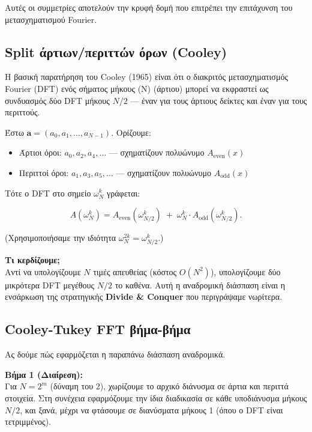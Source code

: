 \documentclass[a4paper, 11pt]{article}
\providecommand{\tightlist}{\setlength{\itemsep}{0pt}\setlength{\parskip}{0pt}}
\begin{document}
Αυτές οι συμμετρίες αποτελούν την κρυφή δομή που επιτρέπει την
επιτάχυνση του μετασχηματισμού Fourier.

\subsection{Split άρτιων/περιττών όρων
(Cooley)}\label{split-ux3acux3c1ux3c4ux3b9ux3c9ux3bdux3c0ux3b5ux3c1ux3b9ux3c4ux3c4ux3ceux3bd-ux3ccux3c1ux3c9ux3bd-cooley}

Η βασική παρατήρηση του Cooley (1965) είναι ότι ο διακριτός
μετασχηματισμός Fourier (DFT) ενός σήματος μήκους (N) (άρτιου) μπορεί να
εκφραστεί ως συνδυασμός δύο DFT μήκους \(N/2\) --- έναν για τους άρτιους
δείκτες και έναν για τους περιττούς.

Έστω \(\mathbf{a} = (a_0, a_1, \dots, a_{N-1})\). Ορίζουμε:

\begin{itemize}
\tightlist
\item
  Άρτιοι όροι: \(a_0, a_2, a_4, \dots\) --- σχηματίζουν πολυώνυμο
  \(A_{\text{even}}(x)\)
\item
  Περιττοί όροι: \(a_1, a_3, a_5, \dots\) --- σχηματίζουν πολυώνυμο
  \(A_{\text{odd}}(x)\)
\end{itemize}

Τότε ο DFT στο σημείο \(\omega_N^k\) γράφεται:

\[
A(\omega_N^k) = A_{\text{even}}(\omega_{N/2}^k) \;+\; \omega_N^k \cdot A_{\text{odd}}(\omega_{N/2}^k).
\]

(Χρησιμοποιήσαμε την ιδιότητα \(\omega_N^{2k} = \omega_{N/2}^k\).)

\textbf{Τι κερδίζουμε;}\\
Αντί να υπολογίζουμε \(N\) τιμές απευθείας (κόστος \(O(N^2)\)),
υπολογίζουμε δύο μικρότερα DFT μεγέθους \(N/2\) το καθένα. Αυτή η
αναδρομική διάσπαση είναι η ενσάρκωση της στρατηγικής \textbf{Divide \&
Conquer} που περιγράψαμε νωρίτερα.

\subsection{Cooley-Tukey FFT
βήμα-βήμα}\label{cooley-tukey-fft-ux3b2ux3aeux3bcux3b1-ux3b2ux3aeux3bcux3b1}

Ας δούμε πώς εφαρμόζεται η παραπάνω διάσπαση αναδρομικά.

\textbf{Βήμα 1 (Διαίρεση):}\\
Για \(N = 2^m\) (δύναμη του 2), χωρίζουμε το αρχικό διάνυσμα σε άρτια
και περιττά στοιχεία. Στη συνέχεια εφαρμόζουμε την ίδια διαδικασία σε
κάθε υποδιάνυσμα μήκους \(N/2\), και ξανά, μέχρι να φτάσουμε σε
διανύσματα μήκους 1 (όπου ο DFT είναι τετριμμένος).
\end{document}
